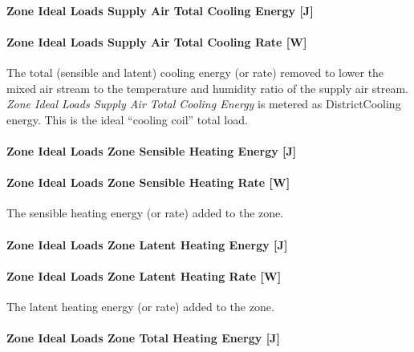 \paragraph{Zone Ideal Loads Supply Air Total Cooling Energy {[}J{]}}\label{zone-ideal-loads-supply-air-total-cooling-energy-j}

\paragraph{Zone Ideal Loads Supply Air Total Cooling Rate {[}W{]}}\label{zone-ideal-loads-supply-air-total-cooling-rate-w}

The total (sensible and latent) cooling energy (or rate) removed to lower the mixed air stream to the temperature and humidity ratio of the supply air stream. \emph{Zone Ideal Loads Supply Air Total Cooling Energy} is metered as DistrictCooling energy. This is the ideal ``cooling coil'' total load.

\paragraph{Zone Ideal Loads Zone Sensible Heating Energy {[}J{]}}\label{zone-ideal-loads-zone-sensible-heating-energy-j}

\paragraph{Zone Ideal Loads Zone Sensible Heating Rate {[}W{]}}\label{zone-ideal-loads-zone-sensible-heating-rate-w}

The sensible heating energy (or rate) added to the zone.

\paragraph{Zone Ideal Loads Zone Latent Heating Energy {[}J{]}}\label{zone-ideal-loads-zone-latent-heating-energy-j}

\paragraph{Zone Ideal Loads Zone Latent Heating Rate {[}W{]}}\label{zone-ideal-loads-zone-latent-heating-rate-w}

The latent heating energy (or rate) added to the zone.

\paragraph{Zone Ideal Loads Zone Total Heating Energy {[}J{]}}\label{zone-ideal-loads-zone-total-heating-energy-j}

